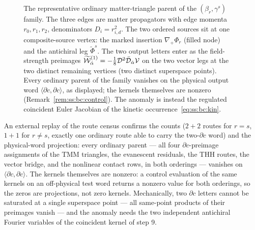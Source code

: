 \begin{figure}[ht]
\centering
{}
\caption{The representative ordinary matter-triangle parent of the
$(\beta_{r},\gamma^{s})$ family. The three edges are matter propagators with
edge momenta $r_{0},r_{1},r_{2}$, denominators $D_{i}=r_{i,d}^{2}$. The two
ordered sources sit at one composite-source vertex: the marked insertion
$\nabla_{+}\Phi_{r}$ (filled node) and the antichiral leg
$\widetilde\Phi^{s}$. The two output letters enter as the field-strength
preimages $\widetilde{\mathcal{W}}_{\dot\alpha}^{(1)}=-\tfrac18\mathcal{D}^{2}\bar{\mathcal{D}}_{\dot\alpha}\mathcal{V}$ on
the two vector legs at the two distinct remaining vertices (two distinct
superspace points). Every ordinary parent of the family vanishes on the
physical output word $\langle\partial c,\partial c\rangle$, as displayed;
the kernels themselves are nonzero
(Remark~\ref{rem:ss:bc:control}). The anomaly is instead the regulated
coincident Euler Jacobian of the kinetic
occurrence~\eqref{eq:ss:bc:kin}.}
\label{fig:ss:bc-triangle}
\end{figure}

\begin{remark}%
\label{rem:ss:bc:control}
An external replay of the route census confirms the counts ($2+2$ routes for
$r=s$, $1+1$ for $r\neq s$, exactly one ordinary route able to carry the
two-$\partial c$ word) and the physical-word projection: every ordinary
parent --- all four $\partial c$-preimage assignments of the TMM triangles,
the evanescent residuals, the THH routes, the vector bridge, and the
nonlinear contact rows, in both orderings --- vanishes on
$\langle\partial c,\partial c\rangle$. The kernels themselves are nonzero: a
control evaluation of the same kernels on an off-physical test word returns a
nonzero value for both orderings, so the zeros are projections, not zero
kernels. Mechanically, two $\partial c$ letters cannot be saturated at a
single superspace point --- all same-point products of their preimages
vanish --- and the anomaly needs the two independent antichiral Fourier
variables of the coincident kernel of step 9.
\end{remark}

